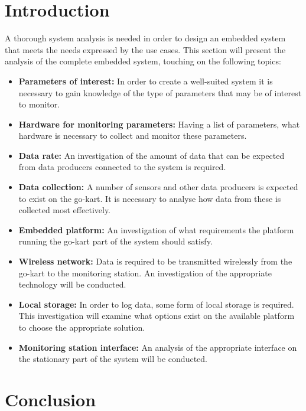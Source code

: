 \section{Introduction} %
\label{sec:system_analysis}
A thorough system analysis is needed in order to design an embedded system that meets the needs expressed by the use cases. 
This section will present the analysis of the complete embedded system, touching on the following topics:

\begin{itemize}
	\item  \textbf{Parameters of interest:} In order to create a well-suited system it is necessary to gain knowledge of the type of parameters that may be of interest to monitor.
	\item \textbf{Hardware for monitoring parameters:} Having a list of parameters, what hardware is necessary to collect and monitor these parameters.
	\item \textbf{Data rate:} An investigation of the amount of data that can be expected from data producers connected to the system is required.
	\item \textbf{Data collection:} A number of sensors and other data producers is expected to exist on the go-kart.
	It is necessary to analyse how data from these is collected most effectively.
	\item \textbf{Embedded platform:} An investigation of what requirements the platform running the go-kart part of the system should satisfy.
	\item \textbf{Wireless network:} Data is required to be transmitted wirelessly from the go-kart to the monitoring station.
	An investigation of the appropriate technology will be conducted.
	\item \textbf{Local storage:} In order to log data, some form of local storage is required.
	This investigation will examine what options exist on the available platform to choose the appropriate solution.
	\item \textbf{Monitoring station interface:} An analysis of the appropriate interface on the stationary part of the system will be conducted.
\end{itemize}















\section{Conclusion}
\label{sec:analysisconclusion}

